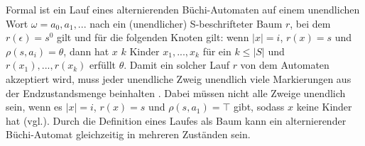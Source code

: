 Formal ist ein Lauf eines alternierenden Büchi-Automaten auf einem unendlichen Wort $\omega=a_0, a_1,...$ nach \cite{vardi+96} ein (unendlicher) S-beschrifteter Baum $r$, bei dem $r(\epsilon)=s^0$ gilt und für die folgenden Knoten gilt: wenn $|x|=i$, $r(x)=s$ und $\rho(s,a_i)=\theta$, dann hat $x$ $k$ Kinder $x_1,...,x_k$ für ein $k\leq|S|$ und ${r(x_1),...,r(x_k)}$ erfüllt $\theta$. Damit ein solcher Lauf $r$ von dem Automaten akzeptiert wird, muss jeder unendliche Zweig unendlich viele Markierungen aus der Endzustandsmenge beinhalten \cite{vardi+96}. Dabei müssen nicht alle Zweige unendlich sein, wenn es $|x|=i$, $r(x)=s$ und $\rho(s,a_1) = \top$ gibt, sodass $x$ keine Kinder hat (vgl.\cite{vardi+96}). Durch die Definition eines Laufes als Baum kann ein alternierender Büchi-Automat gleichzeitig in mehreren Zuständen sein. 

